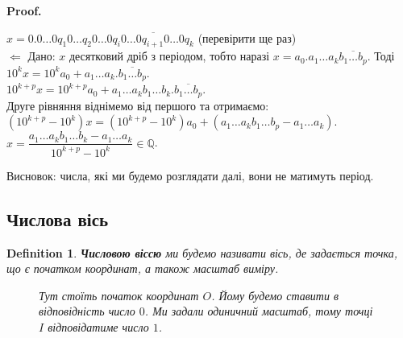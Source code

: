 \documentclass[a4paper, 14pt]{article}
\makeatletter
\def\qed{$\blacksquare$}
\def\leftproof{$\boxed{\Leftarrow}$ }
\theoremstyle{theoremdd}
\theoremstyle{theoremdd}
\newtheorem{definition}[theorem]{Definition}
\theoremstyle{theoremdd}
\theoremstyle{theoremdd}
\theoremstyle{theoremdd}
\theoremstyle{theoremdd}
\theoremstyle{theoremdd}
\theoremstyle{theoremdd}
\renewenvironment{proof}[1][Proof.\\]{\par
\pushQED{\hfill \qed}%
\normalfont \topsep6\p@\@plus6\p@\relax
\trivlist
\item\relax
{\bfseries
#1\@addpunct{.}}\hspace\labelsep\ignorespaces
}{%
\popQED\endtrivlist\@endpefalse
}
\makeatother
\begin{document}
\begin{proof}
	$x = 0.0\dots 0 q_1 0 \dots q_2 0 \dots 0 \overline{q_i 0 \dots 0 q_{i+1} 0 \dots 0 q_k}$ (перевірити ще раз)
	\bigskip \\
	\leftproof Дано: $x$ десятковий дріб з періодом, тобто наразі $x = a_0.a_1 \dots a_k \overline{b_1 \dots b_p}$. Тоді\\
	$10^k x = 10^k a_0 + a_1 \dots a_k.\overline{b_1 \dots b_p}$.\\
	$10^{k+p} x = 10^{k+p} a_0 + a_1 \dots a_k b_1 \dots b_k. \overline{b_1 \dots b_p}$.\\
	Друге рівняння віднімемо від першого та отримаємо:\\
	$(10^{k+p} - 10^k)x = (10^{k+p} - 10^k)a_0 + (a_1 \dots a_k b_1 \dots b_p - a_1 \dots a_k)$.\\
	$x = \dfrac{a_1 \dots a_k b_1 \dots b_k - a_1 \dots a_k}{10^{k+p} - 10^k} \in \mathbb{Q}$.
	\end{proof}
	
	Висновок: числа, які ми будемо розглядати далі, вони не матимуть період.
	\fi
	
	\subsection{Числова вісь}
	\begin{definition}
	\textbf{Числовою віссю} ми будемо називати вісь, де задається точка, що є початком координат, а також масштаб виміру.
	\begin{figure}[H]
	\centering
	\caption*{Тут стоїть початок координат $O$. Йому будемо ставити в відповідність число $0$. Ми задали одиничний масштаб, тому точці $I$ відповідатиме число $1$.}
	\end{figure}
	\end{definition}
\end{document}
